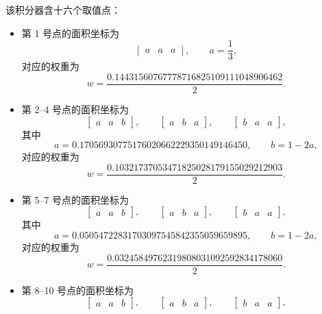 该积分器含十六个取值点：
\begin{itemize}[wide]
\item 第 1 号点的面积坐标为
\begin{equation}
\begin{bmatrix}a & a & a\end{bmatrix},\qquad a=\frac{1}{3},
\end{equation}
对应的权重为
\begin{equation}
w=\frac{0.14431560767778716825109111048906462}{2}.
\end{equation}
\item 第 2–4 号点的面积坐标为
\begin{equation}
\begin{bmatrix}a & a & b\end{bmatrix},\qquad\begin{bmatrix}a & b & a\end{bmatrix},\qquad\begin{bmatrix}b & a & a\end{bmatrix},
\end{equation}
其中
\begin{equation}
a=0.17056930775176020662229350149146450,\qquad b=1-2a,
\end{equation}
对应的权重为
\begin{equation}
w=\frac{0.10321737053471825028179155029212903}{2}.
\end{equation}
\item 第 5–7 号点的面积坐标为
\begin{equation}
\begin{bmatrix}a & a & b\end{bmatrix},\qquad\begin{bmatrix}a & b & a\end{bmatrix},\qquad\begin{bmatrix}b & a & a\end{bmatrix},
\end{equation}
其中
\begin{equation}
a=0.05054722831703097545842355059659895,\qquad b=1-2a,
\end{equation}
对应的权重为
\begin{equation}
w=\frac{0.03245849762319808031092592834178060}{2}.
\end{equation}
\item 第 8–10 号点的面积坐标为
\begin{equation}
\begin{bmatrix}a & a & b\end{bmatrix},\qquad\begin{bmatrix}a & b & a\end{bmatrix},\qquad\begin{bmatrix}b & a & a\end{bmatrix},

\end{equation}
\end{itemize}
